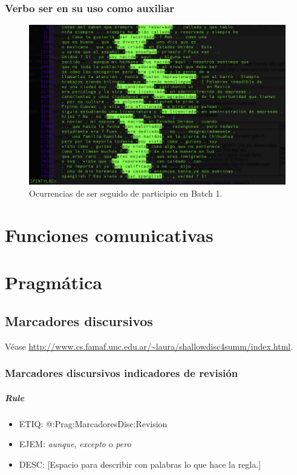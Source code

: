 \documentclass[11pt]{report}
\begin{document}
\subsection{Verbo ser en su uso como auxiliar}
\begin{figure}[htb]

\centering

\includegraphics[scale=0.5]{Figs/InstancesOfSerPlusParticiple.png}

\caption{Ocurrencias de ser seguido de participio en Batch 1.}

\label{fig:InstancesOfSerPlusParticiple}

\end{figure}

\chapter{Funciones comunicativas}
\chapter{Pragmática}
\section{Marcadores discursivos}
Véase \url{http://www.cs.famaf.unc.edu.ar/~laura/shallowdisc4summ/index.html}.

\subsection{Marcadores discursivos indicadores de revisión}
\paragraph*{Rule}
\begin{itemize}
\item ETIQ: @:Prag:MarcadoresDisc:Revision
\item EJEM: \emph{aunque}, \emph{excepto} o \emph{pero}
\item DESC: [Espacio para describir con palabras lo que hace la regla.]
\end{itemize}
\end{document}
